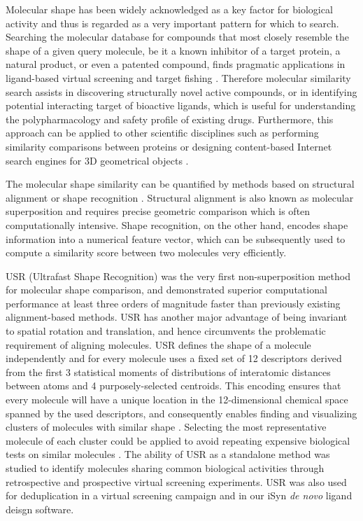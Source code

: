 Molecular shape has been widely acknowledged as a key factor for biological activity and thus is regarded as a very important pattern for which to search. Searching the molecular database for compounds that most closely resemble the shape of a given query molecule, be it a known inhibitor of a target protein, a natural product, or even a patented compound, finds pragmatic applications in ligand-based virtual screening \citep{1332,1380} and target fishing \citep{1407,1408,1402}. Therefore molecular similarity search assists in discovering structurally novel active compounds, or in identifying potential interacting target of bioactive ligands, which is useful for understanding the polypharmacology and safety profile of existing drugs. Furthermore, this approach can be applied to other scientific disciplines such as performing similarity comparisons between proteins or designing content-based Internet search engines for 3D geometrical objects \citep{1280}.

The molecular shape similarity can be quantified by methods based on structural alignment \citep{1440,887,1439} or shape recognition \citep{1379,1338,1331}. Structural alignment is also known as molecular superposition and requires precise geometric comparison which is often computationally intensive. Shape recognition, on the other hand, encodes shape information into a numerical feature vector, which can be subsequently used to compute a similarity score between two molecules very efficiently.%

USR (Ultrafast Shape Recognition) \citep{1379} was the very first non-superposition method for molecular shape comparison, and demonstrated superior computational performance at least three orders of magnitude faster than previously existing alignment-based methods. USR has another major advantage of being invariant to spatial rotation and translation, and hence circumvents the problematic requirement of aligning molecules. USR defines the shape of a molecule independently and for every molecule uses a fixed set of 12 descriptors derived from the first 3 statistical moments of distributions of interatomic distances between atoms and 4 purposely-selected centroids. This encoding ensures that every molecule will have a unique location in the 12-dimensional chemical space spanned by the used descriptors, and consequently enables finding and visualizing clusters of molecules with similar shape \citep{1280,1332}. Selecting the most representative molecule of each cluster could be applied to avoid repeating expensive biological tests on similar molecules \citep{1280}. The ability of USR as a standalone method was studied to identify molecules sharing common biological activities through retrospective \citep{1332} and prospective \citep{1380} virtual screening experiments. USR was also used for deduplication in a virtual screening campaign \citep{1390} and in our iSyn \citep{1409,1387} \textit{de novo} ligand deisgn software.

